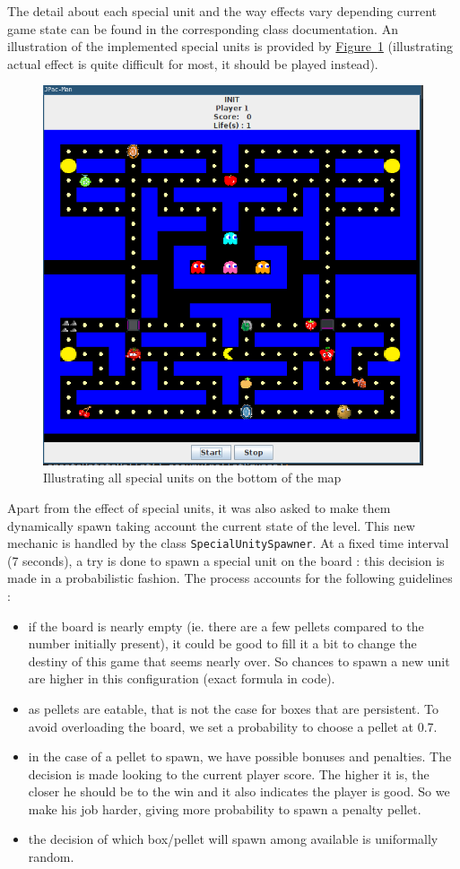\documentclass[]{article}
\newcommand{\wordlink}[2]{\hyperref[#2]{#1~\ref{#2}}}
\begin{document}
The detail about each special unit and the way effects vary depending current game state can be found in the corresponding class documentation. An illustration of the implemented special units is provided by \wordlink{Figure}{fig:S1_special} (illustrating actual effect is quite difficult for most, it should be played instead).\\


\begin{figure}[h]
\centering
\includegraphics[width=0.62\linewidth]{S2-extension}
\caption{Illustrating all special units on the bottom of the map}
\label{fig:S1_special}
\end{figure}

\newpage

Apart from the effect of special units, it was also asked to make them dynamically spawn taking account the current state of the level. This new mechanic is handled by the class \texttt{SpecialUnitySpawner}. At a fixed time interval (7 seconds), a try is done to spawn a special unit on the board : this decision is made in a probabilistic fashion. The process accounts for the following guidelines :
\begin{itemize}
\item if the board is nearly empty (ie. there are a few pellets compared to the number initially present), it could be good to fill it a bit to change the destiny of this game that seems nearly over. So chances to spawn a new unit are higher in this configuration (exact formula in code).
\item as pellets are eatable, that is not the case for boxes that are persistent. To avoid overloading the board, we set a probability to choose a pellet at 0.7.
\item in the case of a pellet to spawn, we have possible bonuses and penalties. The decision is made looking to the current player score. The higher it is, the closer he should be to the win and it also indicates the player is good. So we make his job harder, giving more probability to spawn a penalty pellet.
\item the decision of which box/pellet will spawn among available is uniformally random.
\end{itemize}
\end{document}

